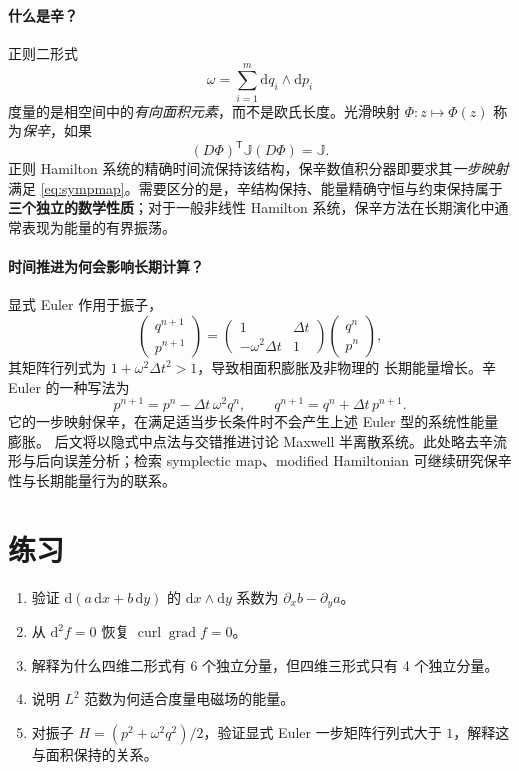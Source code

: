 \documentclass[UTF8,11pt,openany]{ctexbook}
\numberwithin{equation}{chapter}
\theoremstyle{definition}
\theoremstyle{remark}
\newcommand{\dd}{\mathrm d}
\newcommand{\grad}{\operatorname{grad}}
\newcommand{\curl}{\operatorname{curl}}
\begin{document}
\paragraph{什么是辛？}
正则二形式
\begin{equation}
\omega=\sum_{i=1}^m\dd q_i\wedge\dd p_i
\end{equation}
度量的是相空间中的\emph{有向面积元素}，而不是欧氏长度。光滑映射
$\Phi:z\mapsto\Phi(z)$ 称为\emph{保辛}，如果
\begin{equation}\label{eq:sympmap}
(D\Phi)^\mathsf T\mathbb J(D\Phi)=\mathbb J.
\end{equation}
正则 Hamilton 系统的精确时间流保持该结构，保辛数值积分器即要求其\emph{一步映射}满足 \eqref{eq:sympmap}。需要区分的是，辛结构保持、能量精确守恒与约束保持属于\textbf{三个独立的数学性质}；对于一般非线性 Hamilton 系统，保辛方法在长期演化中通常表现为能量的有界振荡。

\paragraph{时间推进为何会影响长期计算？}
显式 Euler 作用于振子，
\begin{equation}
\begin{pmatrix}q^{n+1}\\p^{n+1}\end{pmatrix}
=\begin{pmatrix}1&\Delta t\\-\omega^2\Delta t&1\end{pmatrix}
\begin{pmatrix}q^n\\p^n\end{pmatrix},
\end{equation}
其矩阵行列式为 $1+\omega^2\Delta t^2>1$，导致相面积膨胀及非物理的
长期能量增长。辛 Euler 的一种写法为
\begin{equation}\label{eq:sympeuler}
 p^{n+1}=p^n-\Delta t\,\omega^2q^n,\qquad
 q^{n+1}=q^n+\Delta t\,p^{n+1}.
\end{equation}
它的一步映射保辛，在满足适当步长条件时不会产生上述 Euler 型的系统性能量膨胀。
后文将以隐式中点法与交错推进讨论 Maxwell 半离散系统。此处略去辛流形与后向误差分析；检索 symplectic map、modified Hamiltonian 可继续研究保辛性与长期能量行为的联系。

\section{练习}
\begin{enumerate}
\item 验证 $\dd(a\,\dd x+b\,\dd y)$ 的 $\dd x\wedge\dd y$ 系数为 $\partial_xb-\partial_ya$。
\item 从 $\dd^2f=0$ 恢复 $\curl\grad f=0$。
\item 解释为什么四维二形式有 6 个独立分量，但四维三形式只有 4 个独立分量。
\item 说明 $L^2$ 范数为何适合度量电磁场的能量。
\item 对振子 $H=(p^2+\omega^2q^2)/2$，验证显式 Euler 一步矩阵行列式大于 $1$，解释这与面积保持的关系。
\end{enumerate}
\end{document}
